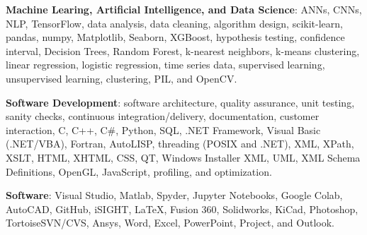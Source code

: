 \documentclass{leresume}
\begin{document}
    \begin{bulletedlist}
		
		\item \textbf{Machine Learing, Artificial Intelligence, and Data Science}: ANNs,
                        CNNs,
                        NLP,
                        TensorFlow,
                        data analysis,
                        data cleaning,
                        algorithm design,
                        scikit-learn,
                        pandas,
                        numpy,
                        Matplotlib,
                        Seaborn,
                        XGBoost,
                        hypothesis testing,
                        confidence interval,
                        Decision Trees,
                        Random Forest,
                        k-nearest neighbors,
                        k-means clustering,
                        linear regression,
                        logistic regression,
                        time series data,
                        supervised learning,
                        unsupervised learning,
                        clustering,
                        PIL,
                        and OpenCV.
                        
		\item \textbf{Software Development}: software architecture,
                        quality assurance,
                        unit testing,
                        sanity checks,
                        continuous integration/delivery,
                        documentation,
                        customer interaction,
                        C,
                        C++,
                        C\#,
                        Python,
                        SQL,
                        .NET Framework,
                        Visual Basic (.NET/VBA),
                        Fortran,
                        AutoLISP,
                        threading (POSIX and .NET),
                        XML,
                        XPath,
                        XSLT,
                        HTML,
                        XHTML,
                        CSS,
                        QT,
                        Windows Installer XML,
                        UML,
                        XML Schema Definitions,
                        OpenGL,
                        JavaScript,
                        profiling,
                        and optimization.
                        
		\item \textbf{Software}: Visual Studio,
                        Matlab,
                        Spyder,
                        Jupyter Notebooks,
                        Google Colab,
                        AutoCAD,
                        GitHub,
                        iSIGHT,
                        LaTeX,
                        Fusion 360,
                        Solidworks,
                        KiCad,
                        Photoshop,
                        TortoiseSVN/CVS,
                        Ansys,
                        Word,
                        Excel,
                        PowerPoint,
                        Project,
                        and Outlook.
                        

\end{bulletedlist}
\end{document}
